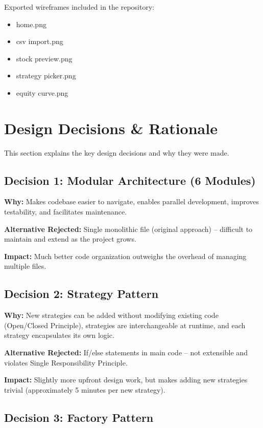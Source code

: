 \documentclass[11pt,a4paper]{article}
\begin{document}
Exported wireframes included in the repository:
\begin{itemize}[noitemsep]
    \item home.png
    \item csv import.png
    \item stock preview.png
    \item strategy picker.png
    \item equity curve.png
\end{itemize}

\newpage
\section{Design Decisions \& Rationale}

This section explains the key design decisions and why they were made.

\subsection{Decision 1: Modular Architecture (6 Modules)}

\textbf{Why:} Makes codebase easier to navigate, enables parallel development, improves testability, and facilitates maintenance.

\textbf{Alternative Rejected:} Single monolithic file (original approach) -- difficult to maintain and extend as the project grows.

\textbf{Impact:} Much better code organization outweighs the overhead of managing multiple files.

\subsection{Decision 2: Strategy Pattern}

\textbf{Why:} New strategies can be added without modifying existing code (Open/Closed Principle), strategies are interchangeable at runtime, and each strategy encapsulates its own logic.

\textbf{Alternative Rejected:} If/else statements in main code -- not extensible and violates Single Responsibility Principle.

\textbf{Impact:} Slightly more upfront design work, but makes adding new strategies trivial (approximately 5 minutes per new strategy).

\subsection{Decision 3: Factory Pattern}
\end{document}
